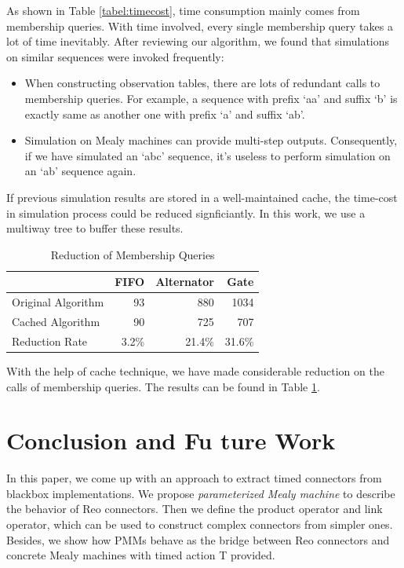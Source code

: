 \documentclass[conference, a4paper]{IEEEtran}
\begin{document}
As shown in Table \ref{tabel:timecost}, time consumption mainly comes from membership queries.
With time involved, every single membership query takes a lot of time inevitably.
After reviewing our algorithm, we found that simulations on similar sequences were invoked frequently:

\begin{itemize}
  \item When constructing observation tables, there are lots of redundant calls to membership
    queries. For example, a sequence with prefix `aa' and suffix `b' is exactly same as another one
    with prefix `a' and suffix `ab'.
  \item Simulation on Mealy machines can provide multi-step outputs.  Consequently, if we have
    simulated an `abc' sequence, it's useless to perform simulation on an `ab' sequence again.
\end{itemize}

If previous simulation results are stored in a well-maintained cache, the time-cost in
simulation process could be reduced signficiantly. In this work, we use a multiway tree to buffer
these results.

\begin{table}[ht]
  \renewcommand{\arraystretch}{1.3}
  \caption{Reduction of Membership Queries}
  \label{tabel:cacheoptimization}
  \centering
  \begin{tabular}{l||rrr}
    \hline
    & FIFO & Alternator & Gate \\
    \hline\hline
    Original Algorithm & 93 & 880 & 1034 \\
    Cached Algorithm & 90 & 725 & 707 \\
    Reduction Rate & 3.2\% & 21.4\% & 31.6\% \\
    \hline
  \end{tabular}
\end{table}

With the help of cache technique, we have made considerable reduction on the calls of membership queries. The results
can be found in Table \ref{tabel:cacheoptimization}.

\section{Conclusion and Fu ture Work}
In this paper, we come up with an approach to extract timed connectors from blackbox
implementations. We propose \emph{parameterized Mealy machine} to describe the behavior of Reo
connectors. Then we define the product operator and link operator, which can be used to
construct complex connectors from simpler ones.
Besides, we show how PMMs behave as the bridge between Reo connectors and concrete Mealy
machines with timed action T provided. 
\end{document}

